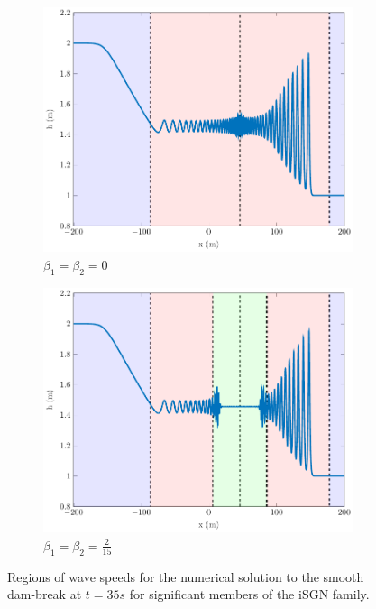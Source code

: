 \documentclass[10pt]{elsarticle}
\begin{document}
\begin{figure}
	\centering
	\begin{subfigure}{0.49\textwidth}
		\centering
		\includegraphics[width=\textwidth]{./Figures/Simulations/Study/ImpDisp/Regions/hRegionsSerre.pdf}
		\caption{$\beta_1 = \beta_2 = 0$}
	\end{subfigure}
	\begin{subfigure}{0.49\textwidth}
		\centering
		\includegraphics[width=\textwidth]{./Figures/Simulations/Study/ImpDisp/Regions/hRegionsImpDisp.pdf}
		\caption{$\beta_1 = \beta_2 = \frac{2}{15}$}
	\end{subfigure}
	\caption{Regions of wave speeds for the numerical solution to the smooth dam-break at $t=35s$ for significant members of the iSGN family.}
	\label{Fig:ImpDisp_LinWVSB}
\end{figure}
\end{document}
